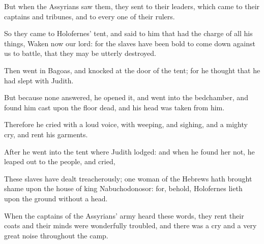 {\par }{\PP {}But when the Assyrians saw them, they sent to their leaders, which came to their captains and tribunes, and to every one of their rulers.
\par }{\PP {}So they came to Holofernes’ tent, and said to him that had the charge of all his things, Waken now our lord: for the slaves have been bold to come down against us to battle, that they may be utterly destroyed.
\par }{\PP {}Then went in Bagoas, and knocked at the door of the tent; for he thought that he had slept with Judith.
\par }{\PP {}But because none answered, he opened it, and went into the bedchamber, and found him cast upon the floor dead, and his head was taken from him.
\par }{\PP {}Therefore he cried with a loud voice, with weeping, and sighing, and a mighty cry, and rent his garments.
\par }{\PP {}After he went into the tent where Judith lodged: and when he found her not, he leaped out to the people, and cried,
\par }{\PP {}These slaves have dealt treacherously; one woman of the Hebrews hath brought shame upon the house of king Nabuchodonosor: for, behold, Holofernes lieth upon the ground without a head.
\par }{\PP {}When the captains of the Assyrians’ army heard these words, they rent their coats and their minds were wonderfully troubled, and there was a cry and a very great noise throughout the camp.

}
